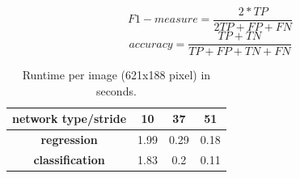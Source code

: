 \begin{equation} \label{eq:fMeasure}
F1-measure = \frac{2*TP}{2TP +FP +FN}
\end{equation}
\begin{equation} \label{eq:accuracy}
accuracy = \frac{TP + TN}{TP + FP + TN + FN}
\end{equation}

 \begin{table}[]
 	\begin{center}
 		\begin{tabular}{c|ccc}
 			\toprule
 			\textbf{network type/stride} & \textbf{10} & \textbf{37} & \textbf{51} \\
 			\midrule
 			\textbf{regression} & 1.99 & 0.29 & 0.18 \\
 			\textbf{classification} & 1.83 & 0.2 & 0.11\\
 			\bottomrule
 		\end{tabular}
 		\caption{Runtime per image (621x188 pixel) in seconds.}
 		\label{tab:runtime}
 	\end{center}
 \end{table}
 
